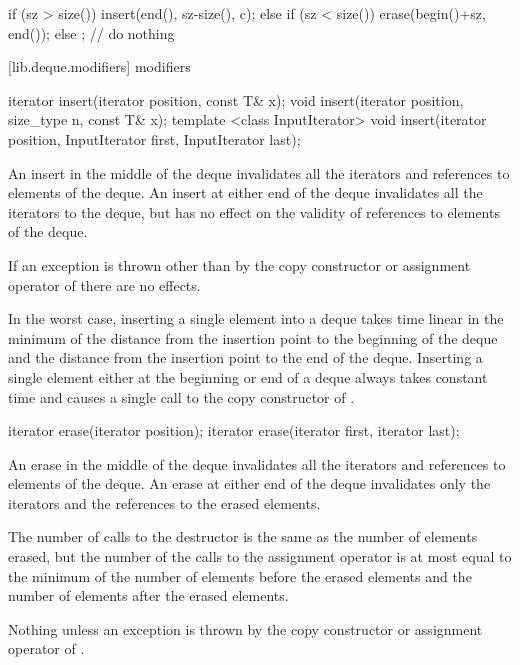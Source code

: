 \begin{itemdescr}
\pnum
\effects
\begin{codeblock}
    if (sz > size())
      insert(end(), sz-size(), c);
    else if (sz < size())
      erase(begin()+sz, end());
    else
      ;                             // do nothing
\end{codeblock}
\end{itemdescr}

[lib.deque.modifiers]{ modifiers}

%
\begin{itemdecl}
iterator insert(iterator position, const T& x);
void     insert(iterator position, size_type n, const T& x);
template <class InputIterator>
  void insert(iterator position,
              InputIterator first, InputIterator last);
\end{itemdecl}

\begin{itemdescr}
\pnum
\effects
An insert in the middle of the deque invalidates all the iterators and
references to elements of the deque.
An insert at either end of the
deque invalidates all the iterators to the deque, but has no effect on
the validity of references to elements of the deque.

\pnum
\notes
If an exception is thrown other than by the
copy constructor or assignment operator of
there are no effects.

\pnum
\complexity
In the worst case, inserting a single element into a deque takes time linear
in the minimum of the distance from the insertion point to the beginning of the
deque and the distance from the insertion point to the end of the deque.
Inserting a single element either at the beginning or end of a deque always takes constant time
and causes a single call to the copy constructor of
.
\end{itemdescr}

%
\begin{itemdecl}
iterator erase(iterator position);
iterator erase(iterator first, iterator last);
\end{itemdecl}

\begin{itemdescr}
\pnum
\effects
An erase in the middle of the deque invalidates all the iterators and references
to elements of the deque.
An erase at either end of the deque invalidates only the iterators and the
references to the erased elements.

\pnum
\complexity
The number of calls to the destructor is the same as the
number of elements erased, but the number of the calls to the assignment operator is
at most equal to the minimum of the number of elements before the erased elements
and the number of elements after the erased elements.

\pnum
\throws
Nothing unless an exception is thrown by the copy constructor or
assignment operator of
.
\end{itemdescr}

